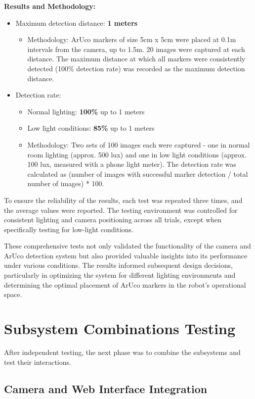 \textbf{Results and Methodology:}
\begin{itemize}
	\item Maximum detection distance: \textbf{1 meters}
	\begin{itemize}
		\item Methodology: ArUco markers of size 5cm x 5cm were placed at 0.1m intervals from the camera, up to 1.5m. 20 images were captured at each distance. The maximum distance at which all markers were consistently detected (100\% detection rate) was recorded as the maximum detection distance.
	\end{itemize}
	\item Detection rate: 
	\begin{itemize}
		\item Normal lighting: \textbf{100\%} up to 1 meters
		\item Low light conditions: \textbf{85\%} up to 1 meters
		\item Methodology: Two sets of 100 images each were captured - one in normal room lighting (approx. 500 lux) and one in low light conditions (approx. 100 lux, measured with a phone light meter). The detection rate was calculated as (number of images with successful marker detection / total number of images) * 100.
	\end{itemize}
\end{itemize}

To ensure the reliability of the results, each test was repeated three times, and the average values were reported. The testing environment was controlled for consistent lighting and camera positioning across all trials, except when specifically testing for low-light conditions.

These comprehensive tests not only validated the functionality of the camera and ArUco detection system but also provided valuable insights into its performance under various conditions. The results informed subsequent design decisions, particularly in optimizing the system for different lighting environments and determining the optimal placement of ArUco markers in the robot's operational space.

\section{Subsystem Combinations Testing}

After independent testing, the next phase was to combine the subsystems and test their interactions.

\subsection{Camera and Web Interface Integration}

